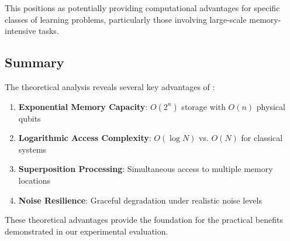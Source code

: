 This positions \qmnn as potentially providing computational advantages for specific classes of learning problems, particularly those involving large-scale memory-intensive tasks.

\subsection{Summary}

The theoretical analysis reveals several key advantages of \qmnn:

\begin{enumerate}
    \item \textbf{Exponential Memory Capacity}: $O(2^n)$ storage with $O(n)$ physical qubits
    \item \textbf{Logarithmic Access Complexity}: $O(\log N)$ vs. $O(N)$ for classical systems
    \item \textbf{Superposition Processing}: Simultaneous access to multiple memory locations
    \item \textbf{Noise Resilience}: Graceful degradation under realistic noise levels
\end{enumerate}

These theoretical advantages provide the foundation for the practical benefits demonstrated in our experimental evaluation.
